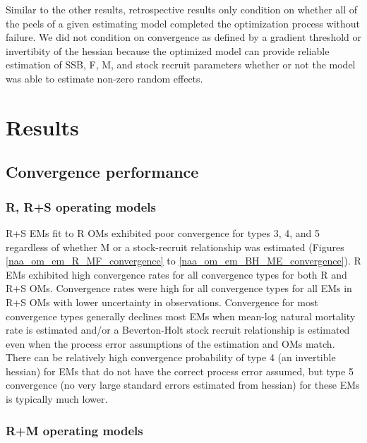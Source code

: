 \documentclass[
  12pt,
]{article}
\begin{document}
Similar to the other results, retrospective results only condition on
whether all of the peels of a given estimating model completed the
optimization process without failure. We did not condition on
convergence as defined by a gradient threshold or invertibity of the
hessian because the optimized model can provide reliable estimation of
SSB, F, M, and stock recruit parameters whether or not the model was
able to estimate non-zero random effects.

\hypertarget{results}{%
\section*{Results}\label{results}}

\hypertarget{convergence-performance}{%
\subsection*{Convergence performance}\label{convergence-performance}}

\hypertarget{r-rs-operating-models}{%
\subsubsection*{R, R+S operating models}\label{r-rs-operating-models}}

R+S EMs fit to R OMs exhibited poor convergence for types 3, 4, and 5
regardless of whether M or a stock-recruit relationship was estimated
(Figures \ref{naa_om_em_R_MF_convergence} to
\ref{naa_om_em_BH_ME_convergence}). R EMs exhibited high convergence
rates for all convergence types for both R and R+S OMs. Convergence
rates were high for all convergence types for all EMs in R+S OMs with
lower uncertainty in observations. Convergence for most convergence
types generally declines most EMs when mean-log natural mortality rate
is estimated and/or a Beverton-Holt stock recruit relationship is
estimated even when the process error assumptions of the estimation and
OMs match. There can be relatively high convergence probability of type
4 (an invertible hessian) for EMs that do not have the correct process
error assumed, but type 5 convergence (no very large standard errors
estimated from hessian) for these EMs is typically much lower.

\hypertarget{rm-operating-models}{%
\subsubsection*{R+M operating models}\label{rm-operating-models}}
\end{document}
